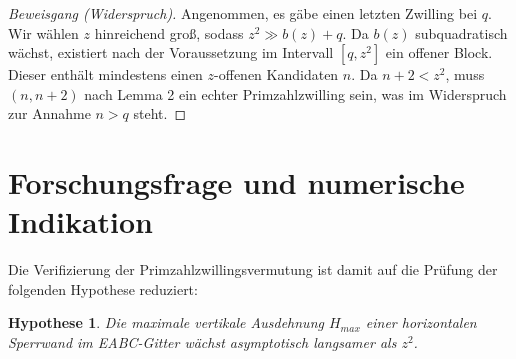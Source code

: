 \documentclass[12pt]{article}
\newtheorem{hypothesis}{Hypothese}
\begin{document}
	\begin{proof}[Beweisgang (Widerspruch)]
		Angenommen, es gäbe einen letzten Zwilling bei $q$. Wir wählen $z$ hinreichend groß, sodass $z^2 \gg b(z) + q$. Da $b(z)$ subquadratisch wächst, existiert nach der Voraussetzung im Intervall $[q, z^2]$ ein offener Block. Dieser enthält mindestens einen $z$-offenen Kandidaten $n$. Da $n+2 < z^2$, muss $(n, n+2)$ nach Lemma 2 ein echter Primzahlzwilling sein, was im Widerspruch zur Annahme $n > q$ steht.
	\end{proof}
	
	\section{Forschungsfrage und numerische Indikation}
	
	Die Verifizierung der Primzahlzwillingsvermutung ist damit auf die Prüfung der folgenden Hypothese reduziert:
	\begin{hypothesis}
		Die maximale vertikale Ausdehnung $H_{max}$ einer horizontalen Sperrwand im EABC-Gitter wächst asymptotisch langsamer als $z^2$.
	\end{hypothesis}
	
\end{document}
